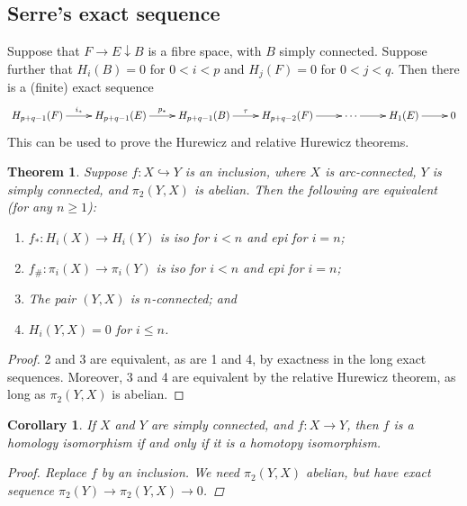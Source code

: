 \documentclass[11pt]{article}
\theoremstyle{plain}
\newtheorem*{thm*}{Theorem}
\newtheorem*{cor*}{Corollary}
\theoremstyle{definition}
\renewcommand{\to}{\longrightarrow}
\newcommand{\squishlist}{
  \setlength{\itemsep}{1pt}
  \setlength{\parskip}{0pt}
  \setlength{\parsep}{0pt}
}
\begin{document}
\subsection{Serre's exact sequence}
Suppose that $F\rightarrow E\downarrow B$ is a fibre space, with $B$ simply connected. Suppose further that $H_i(B)=0$ for $0<i<p$ and $H_j(F)=0$ for $0<j<q$. Then there is a (finite) exact sequence
\[\xymatrix{
H_{p+q-1}(F)\ar[r]^{i_*}&H_{p+q-1}(E)\ar[r]^{p_*}&H_{p+q-1}(B)\ar[r]^{\tau}&H_{p+q-2}(F)\ar[r]&\cdots\ar[r]&H_1(E)\ar[r]&0
}\]
This can be used to prove the Hurewicz and relative Hurewicz theorems.
\begin{thm*}
Suppose $f:X\hookrightarrow Y$ is an inclusion, where $X$ is arc-connected, $Y$ is simply connected, and $\pi_2(Y,X)$ is abelian. Then the following are equivalent (for any $n\geq1$):
\begin{enumerate}
\squishlist
\item $f_*:H_i(X)\to H_i(Y)$ is iso for $i<n$ and epi for $i=n$;
\item $f_\#:\pi_i(X)\to \pi_i(Y)$ is iso for $i<n$ and epi for $i=n$;
\item The pair $(Y,X)$ is $n$-connected; and
\item $H_i(Y,X)=0$ for $i\leq n$.
\end{enumerate}
\end{thm*}
\begin{proof}
2 and 3 are equivalent, as are 1 and 4, by exactness in the long exact sequences. Moreover, 3 and 4 are equivalent by the relative Hurewicz theorem, as long as $\pi_2(Y,X)$ is abelian.
\end{proof}
\begin{cor*} If $X$ and $Y$ are simply connected, and $f:X\to Y$, then $f$ is a homology isomorphism if and only if it is a homotopy isomorphism.
\begin{proof}
Replace $f$ by an inclusion. We need $\pi_2(Y,X)$ abelian, but have exact sequence $\pi_2(Y)\to\pi_2(Y,X)\to0$.
\end{proof}
\end{cor*}
\setcounter{subsection}{5}
\end{document}
